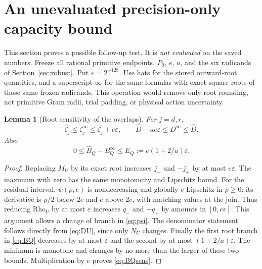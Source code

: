 \documentclass[11pt,a4paper]{article}
\newtheorem{lemma}[theorem]{Lemma}
\theoremstyle{definition}
\theoremstyle{remark}
\numberwithin{equation}{section}
\begin{document}
\section{An unevaluated precision-only capacity bound}\label{sec:precision}

This section proves a possible follow-up test. It is \emph{not evaluated}
on the saved numbers. Freeze all rational primitive endpoints, $P_0$,
$e$, $a$, and the six radicands of Section~\ref{sec:robust}.
Put $\varepsilon=2^{-128}$. Use hats for the stored outward-root
quantities, and a superscript $\infty$ for the same formulas with exact
square roots of those same frozen radicands. This operation would remove
only root rounding, not primitive Gram radii, trial padding, or physical
action uncertainty.

\begin{lemma}[Root sensitivity of the overlaps]\label{lem:rootsens}
For $j=d,r$,
\begin{equation}\label{eq:zetasens}
 \widehat\zeta_j\le\zeta_j^\infty
       \le\widehat\zeta_j+e\varepsilon,\qquad
 \widehat D-ae\varepsilon\le D^\infty\le\widehat D.
\end{equation}
Also
\begin{equation}\label{eq:BQsens}
 0\le\widehat B_Q-B_Q^\infty
       \le E_Q:=e(1+2/a)\varepsilon.
\end{equation}
\end{lemma}
\begin{proof}
Replacing $M_U$ by its exact root increases $j_-$ and $-j_+$
by at most $e\varepsilon$. The maximum with zero has the same
monotonicity and Lipschitz bound.
For the residual interval, $\psi(\rho,e)$ is nondecreasing and globally
$e$-Lipschitz in $\rho\ge0$: its derivative is $\rho/2$ below
$2e$ and $e$ above $2e$, with matching values at the join.
Thus reducing $\mathrm{Rho}_U$ by at most $\varepsilon$ increases
$q_-$ and $-q_+$ by amounts in $[0,e\varepsilon]$.
This argument allows a change of branch in \eqref{eq:psi}.
The denominator statement follows directly from \eqref{eq:DU}, since
only $N_U$ changes. Finally the first root branch in \eqref{eq:BQ}
decreases by at most $\varepsilon$ and the second by at most
$(1+2/a)\varepsilon$. The minimum is monotone and changes by no more
than the larger of these two bounds. Multiplication by $e$ proves
\eqref{eq:BQsens}.
\end{proof}
\end{document}
